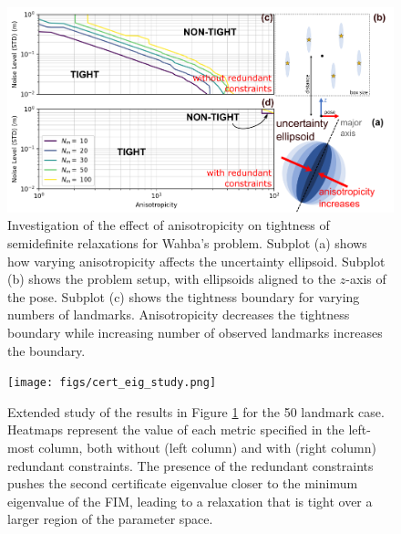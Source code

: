 \documentclass[lettersize,journal]{IEEEtran}
\begin{document}
\begin{figure}[!t]
	\centering
	\includegraphics[width=\columnwidth]{figs/elliposoid_align_fig.png}
	\caption{Investigation of the effect of anisotropicity on tightness of semidefinite relaxations for Wahba's problem.  Subplot (a) shows how varying anisotropicity affects the uncertainty ellipsoid. Subplot (b) shows the problem setup, with ellipsoids aligned to the $z$-axis of the pose. Subplot (c) shows the tightness boundary for varying numbers of landmarks. Anisotropicity decreases the tightness boundary while increasing number of observed landmarks increases the boundary.}
	\label{fig:ellipsoid_align}
\end{figure}


\begin{figure}[!t]
	\centering
	\texttt{[image: figs/cert\_eig\_study.png]}
	\caption{Extended study of the results in Figure \ref{fig:ellipsoid_align} for the 50 landmark case. Heatmaps represent the value of each metric specified in the left-most column, both without (left column) and with (right column) redundant constraints. The presence of the redundant constraints pushes the second certificate eigenvalue closer to the minimum eigenvalue of the FIM, leading to a relaxation that is tight over a larger region of the parameter space.}
	\label{fig:cert_eig_study}
\end{figure}
\end{document}
